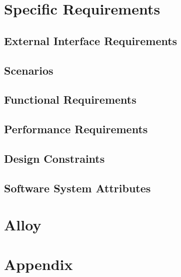 \documentclass[a4paper,12pt]{report}
\begin{document}
	\chapter{Specific Requirements}
	\label{ch:Specific_Requirements}

	\section{External Interface Requirements}
	

	\section{Scenarios}
	

	\section{Functional Requirements} 
	

	\section{Performance Requirements} 
	

	\section{Design Constraints}
	 
	
	\section{Software System Attributes} 
	


	\chapter{Alloy} 
	\label{ch: alloy}

	\appendix
	\chapter{Appendix}
\end{document}

